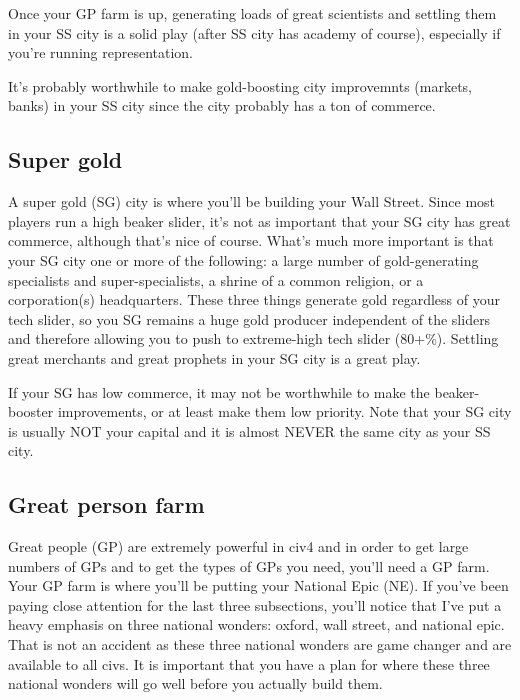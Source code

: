 \documentclass[10pt]{article}
\begin{document}
Once your GP farm is up, generating loads of great scientists and settling
them in your SS city is a solid play (after SS city has academy of course),
especially if you're running representation.

It's probably worthwhile to make gold-boosting city improvemnts (markets, banks)
in your SS city since the city probably has a ton of commerce.

\subsection*{Super gold}

A super gold (SG) city is where you'll be building your Wall Street. Since
most players run a high beaker slider, it's not as important that your SG
city has great commerce, although that's nice of course. What's much more
important is that your SG city one or more of the following: a large number
of gold-generating specialists and super-specialists, a shrine of a common
religion, or a corporation(s) headquarters. These three things generate
gold regardless of your tech slider, so you SG remains a huge gold producer
independent of the sliders and therefore allowing you to push to extreme-high
tech slider (80+\%). Settling great merchants and great prophets in your SG
city is a great play.

If your SG has low commerce, it may not be worthwhile to make the beaker-booster
improvements, or at least make them low priority. Note that your SG city
is usually NOT your capital and it is almost NEVER the same city as your SS city.

\subsection*{Great person farm}

Great people (GP) are extremely powerful in civ4 and in order to get large numbers of
GPs and to get the types of GPs you need, you'll need a GP farm. Your GP farm is where
you'll be putting your National Epic (NE). If you've been paying close attention for the
last three subsections, you'll notice that I've put a heavy emphasis on three national
wonders: oxford, wall street, and national epic. That is not an accident as these three
national wonders are game changer and are available to all civs. It is important that you
have a plan for where these three national wonders will go well before you actually build
them.
\end{document}
